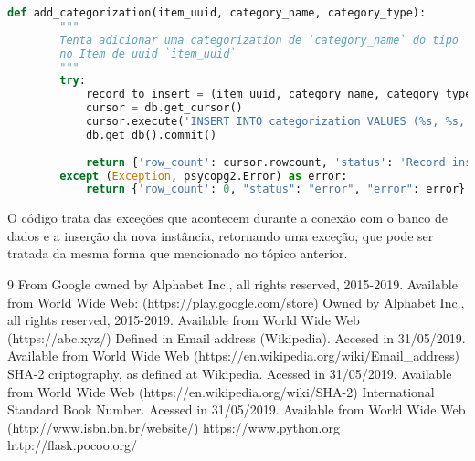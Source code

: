 \documentclass[a4paper, 11pt]{article}
\begin{document}
\begin{itemize}
    \begin{lstlisting}[language=Python]
    def add_categorization(item_uuid, category_name, category_type):
        """
        Tenta adicionar uma categorization de `category_name` do tipo `category_type`
        no Item de uuid `item_uuid`
        """
        try:
            record_to_insert = (item_uuid, category_name, category_type)
            cursor = db.get_cursor()
            cursor.execute('INSERT INTO categorization VALUES (%s, %s, %s);', record_to_insert)
            db.get_db().commit()
    
            return {'row_count': cursor.rowcount, 'status': 'Record inserted successfuly into categorization table', 'error': ''}
        except (Exception, psycopg2.Error) as error:
            return {'row_count': 0, "status": "error", "error": error}
    \end{lstlisting}
    O código trata das exceções que acontecem durante a conexão com o banco de dados e a inserção da nova instância, retornando uma exceção, que pode ser tratada da mesma forma que mencionado no tópico anterior.
    
    
    

    
\end{itemize}

\newpage
\newpage
\begin{thebibliography}{9}
 From Google owned by Alphabet Inc., all rights reserved, 2015-2019. Available from World Wide Web: (https://play.google.com/store)
 Owned by Alphabet Inc., all rights reserved, 2015-2019. Available from World Wide Web (https://abc.xyz/)
 Defined in Email address (Wikipedia). Accesed in 31/05/2019. Available from World Wide Web (https://en.wikipedia.org/wiki/Email\_address)
 SHA-2 criptography, as defined at Wikipedia. Acessed in 31/05/2019. Available from World Wide Web (https://en.wikipedia.org/wiki/SHA-2)
 International Standard Book Number. Acessed in 31/05/2019. Available from World Wide Web (http://www.isbn.bn.br/website/)
 https://www.python.org
 http://flask.pocoo.org/
\end{thebibliography}
\end{document}
